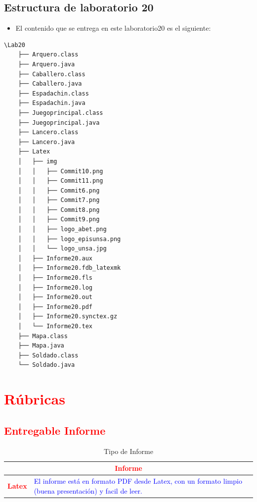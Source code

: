 \documentclass{article}
\begin{document}
	\subsection{Estructura de laboratorio 20}
	\begin{itemize}	
		\item El contenido que se entrega en este laboratorio20 es el siguiente:
	\end{itemize}
	\begin{lstlisting}[style=ascii-tree]
	\Lab20
	├── Arquero.class
	├── Arquero.java
	├── Caballero.class
	├── Caballero.java
	├── Espadachin.class
	├── Espadachin.java
	├── Juegoprincipal.class
	├── Juegoprincipal.java
	├── Lancero.class
	├── Lancero.java
	├── Latex
	│   ├── img
	│   │   ├── Commit10.png
	│   │   ├── Commit11.png
	│   │   ├── Commit6.png
	│   │   ├── Commit7.png
	│   │   ├── Commit8.png
	│   │   ├── Commit9.png
	│   │   ├── logo_abet.png
	│   │   ├── logo_episunsa.png
	│   │   └── logo_unsa.jpg
	│   ├── Informe20.aux
	│   ├── Informe20.fdb_latexmk
	│   ├── Informe20.fls
	│   ├── Informe20.log
	│   ├── Informe20.out
	│   ├── Informe20.pdf
	│   ├── Informe20.synctex.gz
	│   └── Informe20.tex
	├── Mapa.class
	├── Mapa.java
	├── Soldado.class
	└── Soldado.java
	\end{lstlisting}    
	\section{\textcolor{red}{Rúbricas}}
	
	\subsection{\textcolor{red}{Entregable Informe}}
	\begin{table}[H]
		\caption{Tipo de Informe}
		\setlength{\tabcolsep}{0.5em} %
		{\renewcommand{\arraystretch}{1.5}%
		\begin{tabular}{|p{3cm}|p{12cm}|}
			\hline
			\multicolumn{2}{|c|}{\textbf{\textcolor{red}{Informe}}}  \\
			\hline 
			\textbf{\textcolor{red}{Latex}} & \textcolor{blue}{El informe está en formato PDF desde Latex,  con un formato limpio (buena presentación) y facil de leer.}   \\ 
			\hline 
			
			
		\end{tabular}
	}
	\end{table}
	
	\clearpage
	
\end{document}
